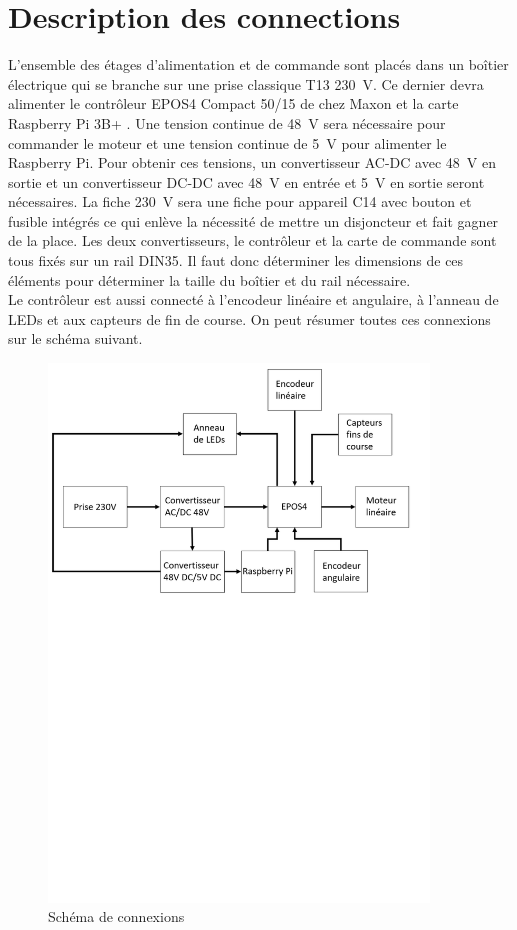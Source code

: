 \section{Description des connections}\label{sec:DescConnect}
L'ensemble des étages d'alimentation et de commande sont placés dans un boîtier électrique qui se branche sur une prise classique T13 230~V. Ce dernier
devra alimenter le contrôleur EPOS4 Compact 50/15 de chez Maxon \cite{Maxon} et la carte Raspberry Pi 3B+ \cite{RaspberryPi}. Une tension continue de 48~V
sera nécessaire pour commander le moteur et une tension continue de 5~V pour alimenter le Raspberry Pi. Pour obtenir ces tensions,
un convertisseur AC-DC avec 48~V en sortie et un convertisseur DC-DC avec 48~V en entrée et 5~V en sortie seront nécessaires. La fiche 230~V
sera une fiche pour appareil C14 avec bouton et fusible intégrés ce qui enlève la nécessité de mettre un disjoncteur et fait gagner de la place. Les deux
convertisseurs, le contrôleur et la carte de commande sont tous fixés sur un rail DIN35. Il faut donc déterminer les dimensions de ces éléments pour
déterminer la taille du boîtier et du rail nécessaire.\\

Le contrôleur est aussi connecté à l'encodeur linéaire et angulaire, à l'anneau de LEDs et aux capteurs de fin de course. On peut résumer toutes
ces connexions sur le schéma suivant.

\begin{figure}[H]
    \centering
    \includegraphics[width = 0.9\textwidth]{assets/figures/SchemaLogique.svg}
    \caption{Schéma de connexions}
    \label{fig:SchemaConnec}
\end{figure}

